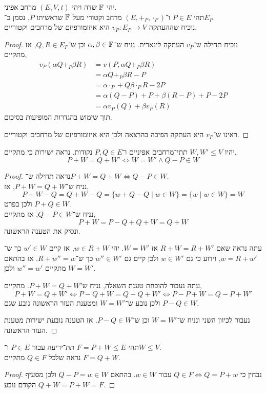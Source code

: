 \question{}
יהי $\mathbb{F}$ שדה ויהי $(E, V, t)$ מרחב אפיני. \\
תהי $P \in E$ ו־$(E, +_P, \cdot_P)$ מרחב וקטורי מעל $\mathbb{F}$ שראשיתו $P$, נסמן כ־$E_P$. \\
נוכיח שההעתקה $v_P : E_P \to V$ היא איזומורפיזם של מרחבים וקטוריים.
\begin{proof}
	נוכיח תחילה ש־$v_P$ העתקה לינארית.
	נניח ש־$\alpha, \beta \in \mathbb{F}$ וכן ש־$Q, R \in E_P$, אז מתקיים,
	\begin{align*}
		v_P(\alpha Q +_P \beta R)
		& = v(P, \alpha Q +_P \beta R) \\
		& = \alpha Q +_P \beta R - P \\
		& = \alpha \cdot_P + Q \beta \cdot_P R - 2P \\
		& = \alpha (Q - P) + P + \beta (R - P) + P - 2P \\
		& = \alpha v_P(Q) + \beta v_P(R)
	\end{align*}
	תוך שימוש בהגדרות המופיעות בסיכום.

	ראינו ש־$v_P$ היא העתקה הפיכה בהרצאה ולכן היא איזומורפיזם של מרחבים וקטוריים.
\end{proof}

\question{}
\subquestion{}
יהיו $W, W' \le V$ תתי־מרחבים אפיניים ו־$P, Q \in E$ נקודות.
נראה ישירות כי מתקיים,
\[
	P + W
	= Q + W'
	\iff W = W' \land Q - P \in W
\]
\begin{proof}
	נראה תחילה ש־$P + W = Q + W \iff Q - P \in W$. \\
	נניח ש־$P + W = Q + W$, אז,
	\[
		P + W - Q
		= Q + W - Q
		= \{ w + Q - Q \mid w \in W \}
		= \{ w \mid w \in W \}
		= W
	\]
	ולכן בפרט $P + Q \in W$. \\
	נניח ש־$Q - P \in W$, אז מתקיים,
	\[
		P + W
		= P - Q + Q + W
		= Q + W
	\]
	ונסיק את הטענה הראשונה.

	עתה נראה שאם $R + W = R + W'$ אז $W = W'$.
	יהי $w \in R + W$, אז קיים $w' \in W$ כך ש־$w = R + w'$, וידוע כי גם $w \in W'$ ולכן קיים גם $w'' \in W'$ כך ש־$R + w'' = w$.
	אז בהתאם מתקיים $w'' = w'$ ולכן $W = W'$.

	עתה נעבור להוכחת טענת השאלה, נניח ש$P + W = Q + W'$.
	מתקיים,
	\[
		P + W = Q + W'
		\iff P - Q + W = Q - Q + W'
		\iff P - P + W = Q - P + W'
	\]
	ולכן נובע ש־$W = W'$ ומטענת העזר הראשונה נובע שגם $P - Q \in W$.

	נעבור לכיוון השני ונניח ש־$W = W'$ וכן ש־$P - Q \in W$.
	אז הטענה נובעת ישירות מטענת העזר הראשונה.
\end{proof}

\subquestion{}
תהי $F = P + W \le E$ תת־יריעה עבור $P \in E$ ו־$W \le V$. \\
נראה שלכל $Q \in F$ מתקיים $F = Q + W$.
\begin{proof}
	נבחין כי $Q \in F \iff Q = P + w$ עבור $w \in W$.
	בהתאם $Q - P = w \in W$ ולכן מסעיף הקודם נובע $Q + W = P + W = F$.
\end{proof}

